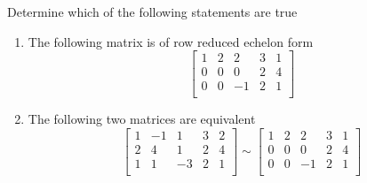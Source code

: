 \documentclass[a4paper,10pt]{article}
\begin{document}
\begin{problem}
Determine which of the following statements are true
\begin{enumerate}
\item The following matrix is of row reduced echelon form
$$
\begin{bmatrix}
1&2&2&3&1\\
0&0&0&2&4\\
0&0&-1&2&1\\
\end{bmatrix}
$$
\item The following two matrices are equivalent
$$
\begin{bmatrix}
1&-1&1&3&2\\
2&4&1&2&4\\
1&1&-3&2&1\\
\end{bmatrix}\sim
\begin{bmatrix}
1&2&2&3&1\\
0&0&0&2&4\\
0&0&-1&2&1\\
\end{bmatrix}
$$
\end{enumerate}
\end{problem}
\end{document}

